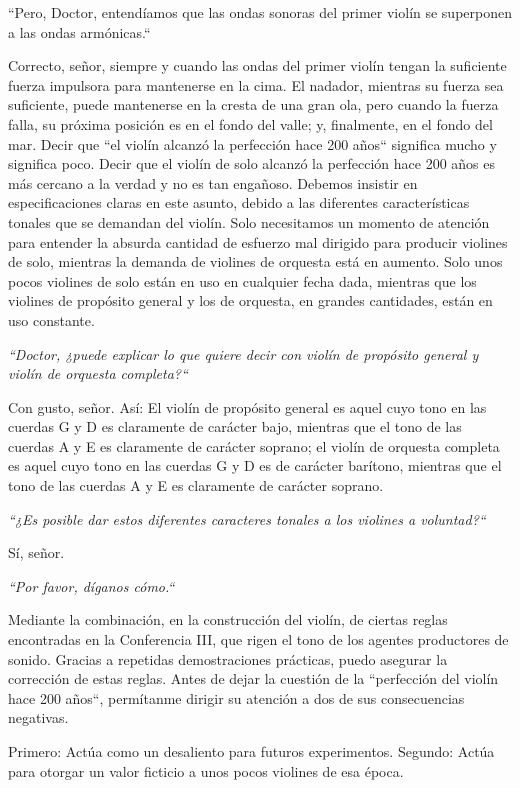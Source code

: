 \documentclass[12pt]{book}
\begin{document}
``Pero, Doctor, entendíamos que las ondas sonoras del primer violín se superponen a las ondas armónicas.``

Correcto, señor, siempre y cuando las ondas del primer violín tengan la suficiente fuerza impulsora para mantenerse en la cima. El nadador, mientras su fuerza sea suficiente, puede mantenerse en la cresta de una gran ola, pero cuando la fuerza falla, su próxima posición es en el fondo del valle; y, finalmente, en el fondo del mar.
Decir que ``el violín alcanzó la perfección hace 200 años`` significa mucho y significa poco. Decir que el violín de solo alcanzó la perfección hace 200 años es más cercano a la verdad y no es tan engañoso. Debemos insistir en especificaciones claras en este asunto, debido a las diferentes características tonales que se demandan del violín. Solo necesitamos un momento de atención para entender la absurda cantidad de esfuerzo mal dirigido para producir violines de solo, mientras la demanda de violines de orquesta está en aumento.
Solo unos pocos violines de solo están en uso en cualquier fecha dada, mientras que los violines de propósito general y los de orquesta, en grandes cantidades, están en uso constante.

\textit{``Doctor, ¿puede explicar lo que quiere decir con violín de propósito general y violín de orquesta completa?``}

Con gusto, señor.
Así: El violín de propósito general es aquel cuyo tono en las cuerdas G y D es claramente de carácter bajo, mientras que el tono de las cuerdas A y E es claramente de carácter soprano; el violín de orquesta completa es aquel cuyo tono en las cuerdas G y D es de carácter barítono, mientras que el tono de las cuerdas A y E es claramente de carácter soprano.

\textit{``¿Es posible dar estos diferentes caracteres tonales a los violines a voluntad?``}

Sí, señor.

\textit{``Por favor, díganos cómo.``}

Mediante la combinación, en la construcción del violín, de ciertas reglas encontradas en la Conferencia III, que rigen el tono de los agentes productores de sonido.
Gracias a repetidas demostraciones prácticas, puedo asegurar la corrección de estas reglas. Antes de dejar la cuestión de la ``perfección del violín hace 200 años``, permítanme dirigir su atención a dos de sus consecuencias negativas.

Primero: Actúa como un desaliento para futuros experimentos.
Segundo: Actúa para otorgar un valor ficticio a unos pocos violines de esa época. 
\end{document}
